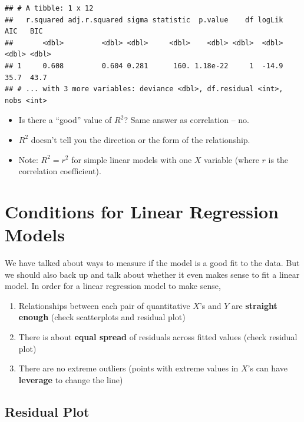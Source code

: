 \documentclass[
]{book}
\providecommand{\tightlist}{%
  \setlength{\itemsep}{0pt}\setlength{\parskip}{0pt}}
\begin{document}
\begin{verbatim}
## # A tibble: 1 x 12
##   r.squared adj.r.squared sigma statistic  p.value    df logLik   AIC   BIC
##       <dbl>         <dbl> <dbl>     <dbl>    <dbl> <dbl>  <dbl> <dbl> <dbl>
## 1     0.608         0.604 0.281      160. 1.18e-22     1  -14.9  35.7  43.7
## # ... with 3 more variables: deviance <dbl>, df.residual <int>, nobs <int>
\end{verbatim}

\begin{itemize}
\item
  Is there a ``good'' value of \(R^2\)? Same answer as correlation -- no.
\item
  \(R^2\) doesn't tell you the direction or the form of the relationship.
\item
  Note: \(R^2 = r^2\) for simple linear models with one \(X\) variable (where \(r\) is the correlation coefficient).
\end{itemize}

\hypertarget{conditions-for-linear-regression-models}{%
\section{Conditions for Linear Regression Models}\label{conditions-for-linear-regression-models}}

We have talked about ways to measure if the model is a good fit to the data. But we should also back up and talk about whether it even makes sense to fit a linear model. In order for a linear regression model to make sense,

\begin{enumerate}
\def\labelenumi{\arabic{enumi}.}
\tightlist
\item
  Relationships between each pair of quantitative \(X\)'s and \(Y\) are \textbf{straight enough} (check scatterplots and residual plot)
\item
  There is about \textbf{equal spread} of residuals across fitted values (check residual plot)
\item
  There are no extreme outliers (points with extreme values in \(X\)'s can have \textbf{leverage} to change the line)
\end{enumerate}

\hypertarget{residual-plot}{%
\subsection{Residual Plot}\label{residual-plot}}
\end{document}
